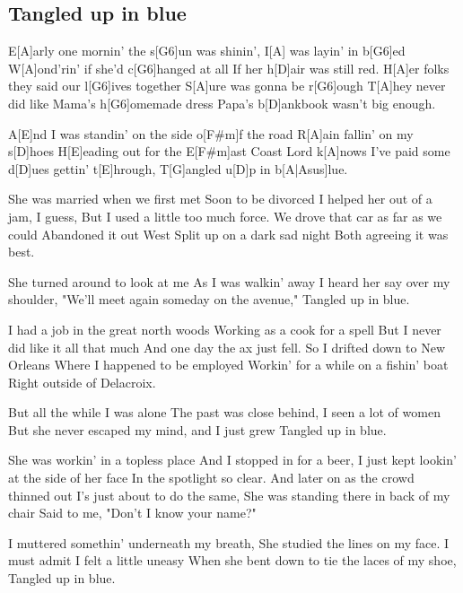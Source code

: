 \subsection*{Tangled up in blue   }
\begin{guitar}

E[A]arly one mornin' the s[G6]un was shinin',
I[A]{} was layin' in b[G6]ed
W[A]ond'rin' if she'd c[G6]hanged at all
If her h[D]air was still red.
H[A]er folks they said our l[G6]ives together
S[A]ure was gonna be r[G6]ough
T[A]hey never did like Mama's h[G6]omemade dress
Papa's b[D]ankbook wasn't big enough.



A[E]nd I was standin' on the side o[F#m]f the road
R[A]ain fallin' on my s[D]hoes
H[E]eading out for the E[F#m]ast Coast
Lord k[A]nows I've paid some d[D]ues gettin' t[E]hrough,
T[G]angled u[D]p in b[A|Asus]lue.



She was married when we first met
Soon to be divorced
I helped her out of a jam, I guess,
But I used a little too much force.
We drove that car as far as we could
Abandoned it out West
Split up on a dark sad night
Both agreeing it was best.



She turned around to look at me
As I was walkin' away
I heard her say over my shoulder,
"We'll meet again someday on the avenue,"
Tangled up in blue.



I had a job in the great north woods
Working as a cook for a spell
But I never did like it all that much
And one day the ax just fell.
So I drifted down to New Orleans
Where I happened to be employed
Workin' for a while on a fishin' boat
Right outside of Delacroix.



But all the while I was alone
The past was close behind,
I seen a lot of women
But she never escaped my mind, and I just grew
Tangled up in blue.



She was workin' in a topless place
And I stopped in for a beer,
I just kept lookin' at the side of her face
In the spotlight so clear.
And later on as the crowd thinned out
I's just about to do the same,
She was standing there in back of my chair
Said to me, "Don't I know your name?"



I muttered somethin' underneath my breath,
She studied the lines on my face.
I must admit I felt a little uneasy
When she bent down to tie the laces of my shoe,
Tangled up in blue.




\end{guitar}
